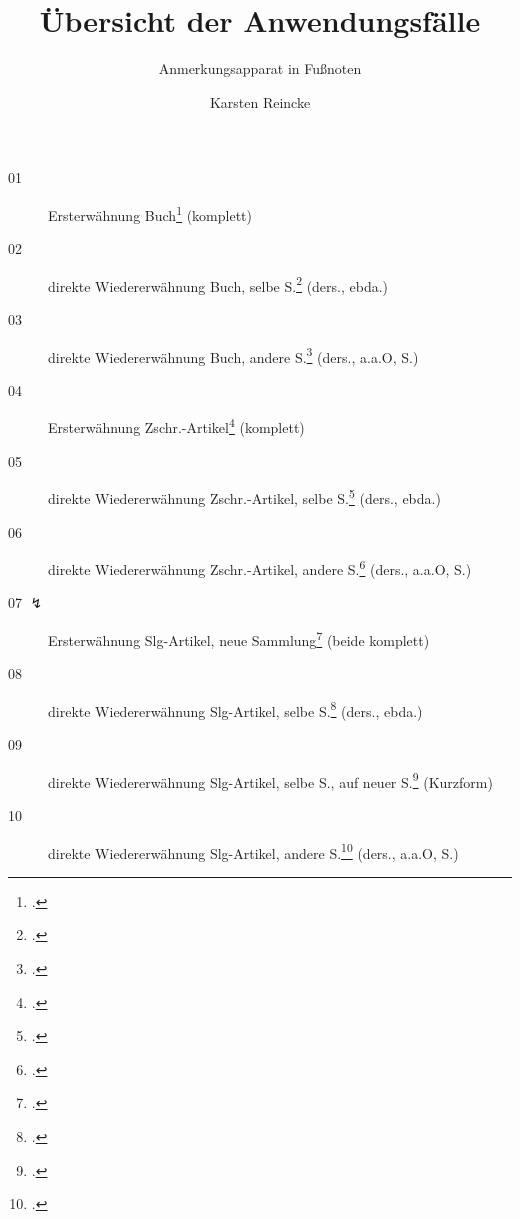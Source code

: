 \documentclass[
  DIV=calc,
  BCOR=5mm,
  11pt,
  smallheadings,
  oneside,
  abstract=true,
  toc=bib]{scrartcl}
\begin{document}
\nocite{*}

\titlehead{mycsrf.verify-: Deutsch}
\subject{(Geistes-) Wissenschaftliche Texte mit modifiziertem \textit{jurabib}}
\title{Übersicht der Anwendungsfälle}
\subtitle{Anmerkungsapparat in Fußnoten}
\author{Karsten Reincke}

\maketitle


\begin{description}

  \item[01 \checkmark] Ersterwähnung
    Buch\footcite[vgl.][12]{KantKdU1974} (komplett) 
  \item[02 \checkmark] direkte Wiedererwähnung
    Buch, selbe S.\footcite[vgl.][12]{KantKdU1974} (ders., ebda.)
  \item[03 \checkmark] direkte Wiedererwähnung
    Buch, andere S.\footcite[vgl.][13]{KantKdU1974} (ders., a.a.O, S.)
  \item[04 \checkmark] Ersterwähnung
    Zschr.-Artikel\footcite[vgl.][12]{McCarthy1980a} (komplett)
  \item[05 \checkmark] direkte Wiedererwähnung
    Zschr.-Artikel,
      selbe S.\footcite[vgl.][12]{McCarthy1980a} (ders., ebda.)
  \item[06 \checkmark] direkte Wiedererwähnung
    Zschr.-Artikel, 
      andere S.\footcite[vgl.][13]{McCarthy1980a} (ders., a.a.O, S.)
  
  \item[07 $\lightning$] Ersterwähnung 
    Slg-Artikel,
      neue Sammlung\footcite[vgl.][12]{Hays1985a} (beide komplett)
  \item[08 \checkmark] direkte Wiedererwähnung
    Slg-Artikel,
      selbe S.\footcite[vgl.][12]{Hays1985a} (ders., ebda.)
      
 \item[09 \checkmark] direkte Wiedererwähnung
    Slg-Artikel,
      selbe S.,
       auf neuer S.\footcite[vgl.][12]{Hays1985a} (Kurzform)
  \item[10 \checkmark] direkte Wiedererwähnung
    Slg-Artikel,
      andere S.\footcite[vgl.][13]{Hays1985a} (ders., a.a.O, S.)
     

\end{description}
\end{document}
